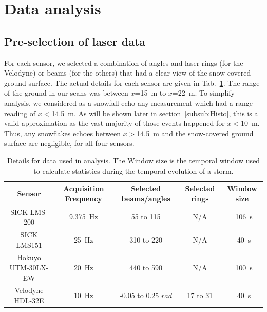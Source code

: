 \section{Data analysis}
\label{sec:data-analysis}

\subsection{Pre-selection of laser data}
For each sensor, we selected a combination of angles and laser rings (for the Velodyne) or beams (for the others) that had a clear view of the snow-covered ground surface. The actual details for each sensor are given in Tab.~\ref{tab:selectionScans}. The range of the ground in our scans was between $x$=\SI{15}{\meter} to $x$=\SI{22}{\meter}. To simplify analysis, we considered as a snowfall echo any measurement which had a range reading of $x<$\SI{14.5}{\meter}. As will be shown later in section~\ref{subsub:Histo}, this is a valid approximation as the vast majority of those events happened for $x<$\SI{10}{\meter}. Thus, any snowflakes echoes between  $x>$\SI{14.5}{\meter} and the snow-covered ground surface are negligible, for all four sensors.

\begin{table}[htbp]
    \centering
    \begin{tabular}{|c|c|c|c|c|}
        \hline
        \textbf{Sensor}            & \textbf{Acquisition Frequency}  & \textbf{Selected beams/angles}  & \textbf{Selected rings}  & \textbf{Window size} \\\hline
        SICK LMS-200               & \SI{9.375}{\Hz}                      & 55 to 115                                    & N/A                         & ~\SI{106}{\second}       \\\hline
        SICK LMS151               & \SI{25}{\Hz}                           & 310 to 220                                  & N/A                         & ~\SI{40}{\second}        \\\hline
        Hokuyo UTM-30LX-EW  & \SI{20}{\Hz}                          & 440 to 590                                  & N/A                         & ~\SI{100}{\second}     \\\hline
        Velodyne HDL-32E        & \SI{10}{\Hz}                          & -0.05 to 0.25 $rad$                     & 17 to 31                   & ~\SI{40}{\second}      \\\hline
    \end{tabular}
    \caption{Details for data used in analysis. The Window size is the temporal window used to calculate statistics during the temporal evolution of a storm.}
    \label{tab:selectionScans}
\end{table}


